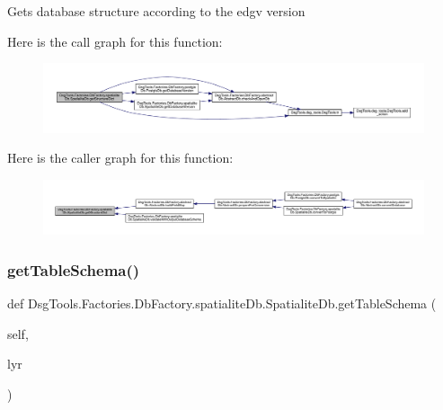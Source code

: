\begin{DoxyVerb}Gets database structure according to the edgv version
\end{DoxyVerb}
 Here is the call graph for this function\+:
\nopagebreak
\begin{figure}[H]
\begin{center}
\leavevmode
\includegraphics[width=350pt]{class_dsg_tools_1_1_factories_1_1_db_factory_1_1spatialite_db_1_1_spatialite_db_aac7bf6aaccd3329118bafb1b9ecd1742_cgraph}
\end{center}
\end{figure}
Here is the caller graph for this function\+:
\nopagebreak
\begin{figure}[H]
\begin{center}
\leavevmode
\includegraphics[width=350pt]{class_dsg_tools_1_1_factories_1_1_db_factory_1_1spatialite_db_1_1_spatialite_db_aac7bf6aaccd3329118bafb1b9ecd1742_icgraph}
\end{center}
\end{figure}
\mbox{\label{class_dsg_tools_1_1_factories_1_1_db_factory_1_1spatialite_db_1_1_spatialite_db_af91a3c13a7dd2782cd555bfd376eeaa3}} 
\subsubsection{\texorpdfstring{get\+Table\+Schema()}{getTableSchema()}}
{\footnotesize\ttfamily def Dsg\+Tools.\+Factories.\+Db\+Factory.\+spatialite\+Db.\+Spatialite\+Db.\+get\+Table\+Schema (\begin{DoxyParamCaption}\item[{}]{self,  }\item[{}]{lyr }\end{DoxyParamCaption})}

